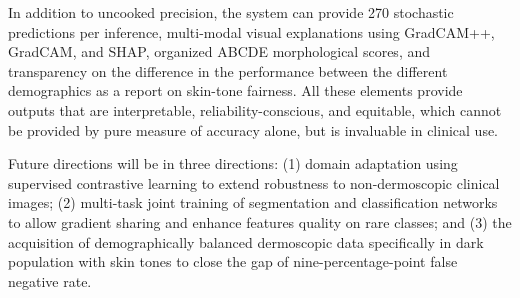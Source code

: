 \documentclass[conference]{IEEEtran}
\begin{document}
In addition to uncooked precision, the system can provide 270 stochastic predictions per inference, multi-modal visual explanations using GradCAM++, GradCAM, and SHAP, organized ABCDE morphological scores, and transparency on the difference in the performance between the different demographics as a report on skin-tone fairness. All these elements provide outputs that are interpretable, reliability-conscious, and equitable, which cannot be provided by pure measure of accuracy alone, but is invaluable in clinical use.

Future directions will be in three directions: (1) domain adaptation using supervised contrastive learning to extend robustness to non-dermoscopic clinical images; (2) multi-task joint training of segmentation and classification networks to allow gradient sharing and enhance features quality on rare classes; and (3) the acquisition of demographically balanced dermoscopic data specifically in dark population with skin tones to close the gap of nine-percentage-point false negative rate.



\end{document}
